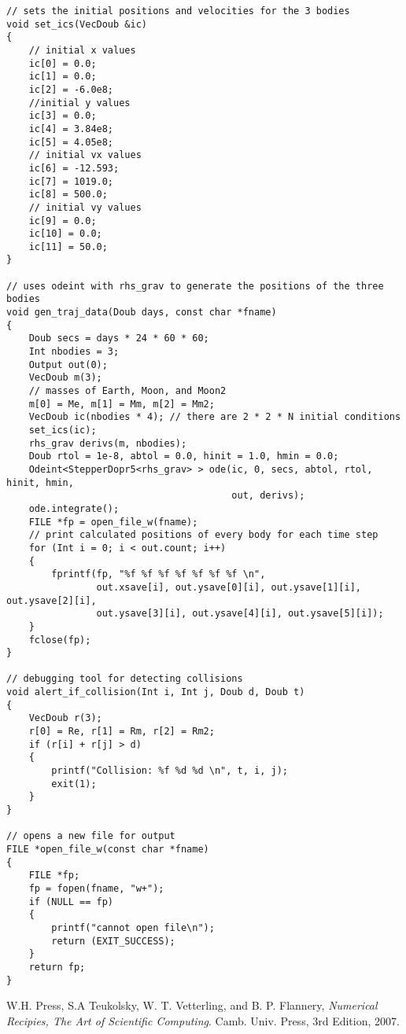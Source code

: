 \documentclass[12pt]{article}
\begin{document}
\begin{lstlisting}
// sets the initial positions and velocities for the 3 bodies
void set_ics(VecDoub &ic)
{
    // initial x values
    ic[0] = 0.0;
    ic[1] = 0.0;
    ic[2] = -6.0e8;
    //initial y values
    ic[3] = 0.0;
    ic[4] = 3.84e8;
    ic[5] = 4.05e8;
    // initial vx values
    ic[6] = -12.593;
    ic[7] = 1019.0;
    ic[8] = 500.0;
    // initial vy values
    ic[9] = 0.0;
    ic[10] = 0.0;
    ic[11] = 50.0;
}

// uses odeint with rhs_grav to generate the positions of the three bodies
void gen_traj_data(Doub days, const char *fname)
{
    Doub secs = days * 24 * 60 * 60;
    Int nbodies = 3;
    Output out(0);
    VecDoub m(3);
    // masses of Earth, Moon, and Moon2
    m[0] = Me, m[1] = Mm, m[2] = Mm2;
    VecDoub ic(nbodies * 4); // there are 2 * 2 * N initial conditions
    set_ics(ic);
    rhs_grav derivs(m, nbodies);
    Doub rtol = 1e-8, abtol = 0.0, hinit = 1.0, hmin = 0.0;
    Odeint<StepperDopr5<rhs_grav> > ode(ic, 0, secs, abtol, rtol, hinit, hmin,
                                        out, derivs);
    ode.integrate();
    FILE *fp = open_file_w(fname);
    // print calculated positions of every body for each time step
    for (Int i = 0; i < out.count; i++)
    {
        fprintf(fp, "%f %f %f %f %f %f %f \n",
                out.xsave[i], out.ysave[0][i], out.ysave[1][i], out.ysave[2][i],
                out.ysave[3][i], out.ysave[4][i], out.ysave[5][i]);
    }
    fclose(fp);
}

// debugging tool for detecting collisions
void alert_if_collision(Int i, Int j, Doub d, Doub t)
{
    VecDoub r(3);
    r[0] = Re, r[1] = Rm, r[2] = Rm2;
    if (r[i] + r[j] > d)
    {
        printf("Collision: %f %d %d \n", t, i, j);
        exit(1);
    }
}

// opens a new file for output
FILE *open_file_w(const char *fname)
{
    FILE *fp;
    fp = fopen(fname, "w+");
    if (NULL == fp)
    {
        printf("cannot open file\n");
        return (EXIT_SUCCESS);
    }
    return fp;
}
\end{lstlisting}

\begin{thebibliography}{9}

  W.H. Press, S.A Teukolsky, W. T. Vetterling, and B. P. Flannery,
  \emph{Numerical Recipies, The Art of Scientific Computing}.
  Camb. Univ. Press,
  3rd Edition,
  2007.

\end{thebibliography}
\end{document}
